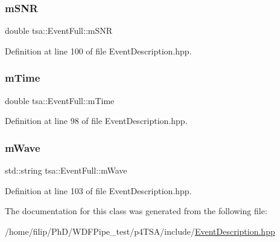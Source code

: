 \subsubsection{\texorpdfstring{m\+S\+NR}{mSNR}}
{\footnotesize\ttfamily double tsa\+::\+Event\+Full\+::m\+S\+NR}



Definition at line 100 of file Event\+Description.\+hpp.

\mbox{\label{classtsa_1_1_event_full_afb3f24f8886fd72902f3c24a18c4fac5}} 
\subsubsection{\texorpdfstring{m\+Time}{mTime}}
{\footnotesize\ttfamily double tsa\+::\+Event\+Full\+::m\+Time}



Definition at line 98 of file Event\+Description.\+hpp.

\mbox{\label{classtsa_1_1_event_full_a3edd346809a57862f998d60b566320b4}} 
\subsubsection{\texorpdfstring{m\+Wave}{mWave}}
{\footnotesize\ttfamily std\+::string tsa\+::\+Event\+Full\+::m\+Wave}



Definition at line 103 of file Event\+Description.\+hpp.



The documentation for this class was generated from the following file\+:\begin{DoxyCompactItemize}
\item 
/home/filip/\+Ph\+D/\+W\+D\+F\+Pipe\+\_\+test/p4\+T\+S\+A/include/\hyperlink{_event_description_8hpp}{Event\+Description.\+hpp}\end{DoxyCompactItemize}
